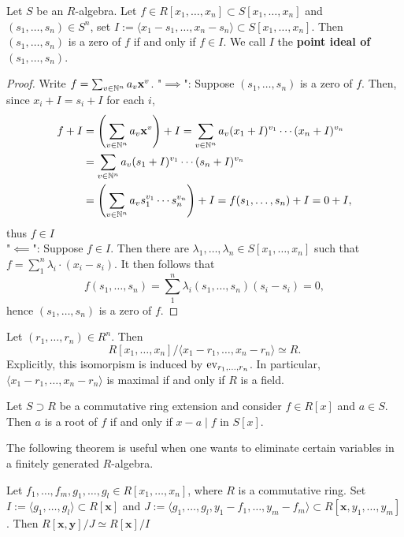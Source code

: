\begin{proposition}\label{AZceroIffPolynomialIsInPointIdeal}
    Let $S$ be an $R$-algebra. Let $f\in R[x_1,\dots,x_n]\subset S[x_1,\dots,x_n]$ and $(s_1,\dots,s_n)\in S^n $, set $I :=\langle x_1-s_1,\dots,x_n-s_n\rangle\subset S[x_1,\dots,x_n] $. Then $(s_1,\dots,s_n)$ is a zero of $f$ if and only if $f\in I$. We call $I$ the \textbf{point ideal of $(s_1,\dots,s_n)$}.
\end{proposition}
\begin{proof}
    Write $f = \sum_{v\in \mathbb{N}^n} a_v \mathbf{x}^v$.
    "$\implies$": Suppose $(s_1,\dots,s_n)$ is a zero of $f$. Then, since $x_i + I = s_i + I$ for each $i$, 
    \begin{align*} 
        f + I &= \left(\sum_{v\in \mathbb{N}^n} a_v \mathbf{x}^v\right) + I = \sum_{v\in \mathbb{N}^n} a_v(x_1+I)^{v_1}\cdots(x_n+I)^{v_n}\\
        & = \sum_{v\in \mathbb{N}^n} a_v(s_1+I)^{v_1}\cdots(s_n+I)^{v_n}  \\ 
        &= \left(\sum_{v\in \mathbb{N}^n} a_v s_1^{v_1}\cdots s_n^{v_n}\right) +I = f(s_1,\dots,s_n) + I = 0 + I,
    \end{align*}
    thus $f \in I$\\
    "$\impliedby$": Suppose $f\in I$. Then there are $\lambda_1,\dots,\lambda_n\in S[x_1,\dots,x_n]$ such that $f = \sum_1^n \lambda_i\cdot(x_i-s_i)$. It then follows that 
    $$f(s_1,\dots,s_n) = \sum_1^n \lambda_i(s_1,\dots,s_n)(s_i-s_i) = 0,$$
    hence $(s_1,\dots, s_n)$ is a zero of $f$.
\end{proof}
\begin{corollary}\label{MaximalIdealsOfPolynomialRings}
    Let $(r_1,\dots,r_n)\in R^n$. Then 
    $$
        R[x_1,\dots,x_n]/\langle x_1-r_1,\dots,x_n-r_n\rangle \simeq R.
    $$ 
    Explicitly, this isomorpism is induced by $\mathrm{ev}_{r_1,\dots,r_n}$. In particular, $\langle x_1-r_1,\dots,x_n-r_n\rangle$ is maximal if and only if $R$ is a field. 
\end{corollary}
\begin{corollary}\label{RootIffMinimalPolynomialDivides}
    Let $S\supset R$ be a commutative ring extension and consider $f\in R[x]$ and $a \in S$. Then $a$ is a root of $f$ if and only if $x-a\mid f$ in $S[x]$. 
\end{corollary}
The following theorem is useful when one wants to eliminate certain variables in a finitely generated $R$-algebra.  
\begin{corollary}\label{EliminationOfVoidVariablesInFinitelyGeneratedAlgebra}
    Let $f_1,\dots,f_m,g_1,\dots,g_l\in R[x_1,\dots,x_n]$, where $R$ is a commutative ring. Set $I:=\langle g_1,\dots,g_l\rangle \subset R[\mathbf{x}]$ and $J:= \langle g_1,\dots,g_l,y_1-f_1,\dots,y_m-f_m\rangle\subset R[\mathbf{x},y_1,\dots,y_m]$. Then $R[\mathbf{x},\mathbf{y}]/J \simeq R[\mathbf{x}]/I$ 
\end{corollary}
